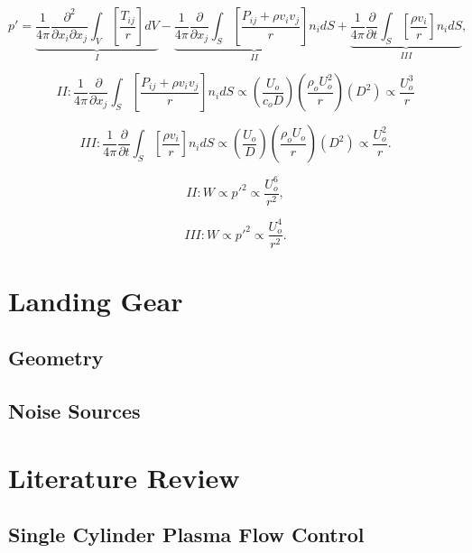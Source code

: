 \begin{equation}
p' = \underbrace{ \frac{1}{4\pi} \frac{\partial^2}{\partial x_i \partial x_j} \int_V \left[ \frac{T_{ij}}{r} \right] dV }_I - \underbrace{ \frac{1}{4\pi} \frac{\partial}{\partial x_j} \int_S \left[ \frac{P_{ij} + \rho v_i v_j}{r} \right] n_i dS }_{II} + \underbrace{ \frac{1}{4\pi} \frac{\partial}{\partial t} \int_S \left[ \frac{\rho v_i}{r} \right] n_i dS}_{III},
\end{equation}

\begin{equation}
II : \frac{1}{4\pi} \frac{\partial}{\partial x_j} \int_S \left[ \frac{P_{ij} + \rho v_i v_j}{r} \right] n_i dS \propto \left( \frac{U_o}{c_oD} \right) \left( \frac{\rho_o U_o^2}{r} \right) \left( D^2 \right) \propto \frac{U_o^3}{r}
\end{equation}

\begin{equation}
III : \frac{1}{4\pi} \frac{\partial}{\partial t} \int_S \left[ \frac{\rho v_i}{r} \right] n_i dS \propto \left( \frac{U_o}{D} \right) \left( \frac{\rho_o U_o}{r} \right) \left( D^2 \right) \propto \frac{U_o^2}{r}.
\end{equation}

\begin{equation}
II : W \propto p'^2 \propto \frac{U_o^6}{r^2},
\end{equation}

\begin{equation}
III : W \propto p'^2 \propto \frac{U_o^4}{r^2}.
\end{equation}

\section{Landing Gear}

\subsection{Geometry}

\subsection{Noise Sources}

\section{Literature Review}

\subsection{Single Cylinder Plasma Flow Control}

